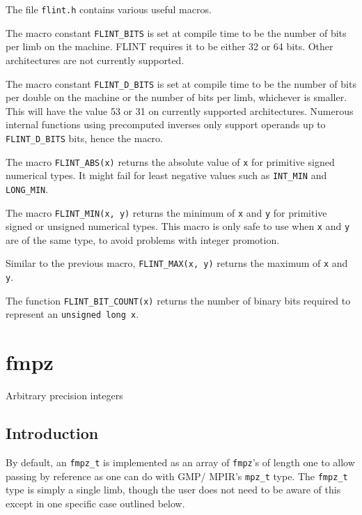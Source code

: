 \documentclass[a4paper,10pt]{book}
\newcommand{\code}{\lstinline}
\begin{document}
The file \code{flint.h} contains various useful macros.

The macro constant \code{FLINT_BITS} is set at compile time to be the 
number of bits per limb on the machine.  FLINT requires it to be either 
32 or 64 bits.  Other architectures are not currently supported.

The macro constant \code{FLINT_D_BITS} is set at compile time to be the 
number of bits per double on the machine or the number of bits per limb, 
whichever is smaller.  This will have the value 53 or 31 on currently 
supported architectures.  Numerous internal functions using precomputed 
inverses only support operands up to \code{FLINT_D_BITS} bits, hence the
macro.

The macro \code{FLINT_ABS(x)} returns the absolute value of \code{x}
for primitive signed numerical types.  It might fail for least negative 
values such as \code{INT_MIN} and \code{LONG_MIN}.

The macro \code{FLINT_MIN(x, y)} returns the minimum of \code{x} and 
\code{y} for primitive signed or unsigned numerical types.  This macro 
is only safe to use when \code{x} and \code{y} are of the same type, 
to avoid problems with integer promotion.

Similar to the previous macro, \code{FLINT_MAX(x, y)} returns the 
maximum of \code{x} and \code{y}.

The function \code{FLINT_BIT_COUNT(x)} returns the number of binary bits 
required to represent an \code{unsigned long x}.


\chapter{fmpz}
\epigraph{Arbitrary precision integers}{}

\section{Introduction}

By default, an \code{fmpz_t} is implemented as an array of \code{fmpz}'s of 
length one to allow passing by reference as one can do with GMP/ MPIR's 
\code{mpz_t} type.  The \code{fmpz_t} type is simply a single limb, though 
the user does not need to be aware of this except in one specific case 
outlined below.
\end{document}
